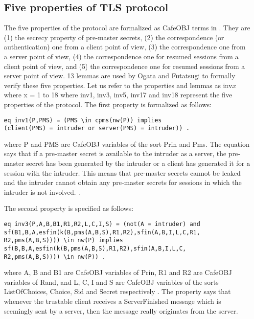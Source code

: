 \documentclass[a4paper,fleqn]{cas-dc}
\begin{document}
\subsection{Five properties of TLS protocol}
The five properties of the protocol are formalized as CafeOBJ terms in \cite{ogata05}. They are (1) the secrecy property of pre-master secrets, (2) the correspondence (or authentication) one from a client point of view, (3) the correspondence one from a server point of view, (4) the correspondence one for resumed sessions from a client point of view, and (5) the correspondence one for resumed sessions from a server point of view. 13 lemmas are used by Ogata and Futatsugi to formally verify these five properties. 
Let us refer to the properties and lemmas as inv\textbf{$x$} where x = 1 to 18 where inv1, inv3, inv5, inv17 and inv18 represent the five properties of the protocol. The first property is formalized as follows: 
\begin{verbatim}
eq inv1(P,PMS) = (PMS \in cpms(nw(P)) implies 
(client(PMS) = intruder or server(PMS) = intruder)) .
\end{verbatim}
where P and PMS are CafeOBJ variables of the sort Prin and Pms. The equation says that if a pre-master secret is available to the intruder as a server, the pre-master secret has been generated by the intruder or a client has generated it for a session with the intruder. This means that pre-master secrets cannot be leaked and the intruder cannot obtain any pre-master secrets for sessions in which the intruder is not involved. .

The second property is specified as follows:
\begin{verbatim}
eq inv3(P,A,B,B1,R1,R2,L,C,I,S) = (not(A = intruder) and 
sf(B1,B,A,esfin(k(B,pms(A,B,S),R1,R2),sfin(A,B,I,L,C,R1,
R2,pms(A,B,S)))) \in nw(P) implies
sf(B,B,A,esfin(k(B,pms(A,B,S),R1,R2),sfin(A,B,I,L,C,
R2,pms(A,B,S)))) \in nw(P)) .
\end{verbatim}
where A, B and B1 are CafeOBJ variables of Prin, R1 and R2 are CafeOBJ variables of Rand, and L, C, I and S are CafeOBJ variables of the sorts ListOfChoices, Choice, Sid and Secret respectively . The property says that whenever the trustable client receives a ServerFinished message which is seemingly sent by a server, then the message really originates from the server. 
\end{document}
